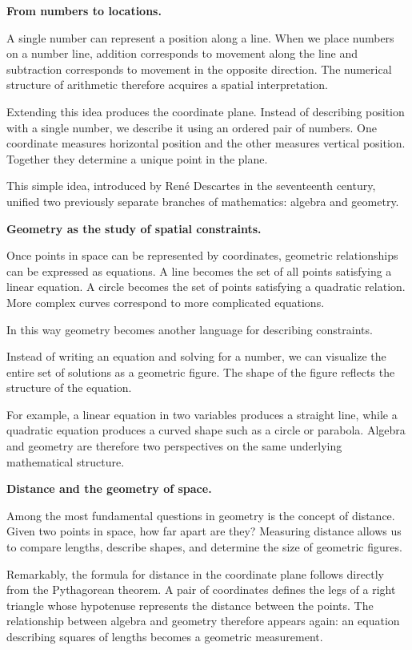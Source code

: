 \documentclass[11pt, openany]{book}
\theoremstyle{plain}
\theoremstyle{definition}
\theoremstyle{remark}
\begin{document}
\medskip

\textbf{From numbers to locations.}

A single number can represent a position along a line. When we place
numbers on a number line, addition corresponds to movement along the
line and subtraction corresponds to movement in the opposite direction.
The numerical structure of arithmetic therefore acquires a spatial
interpretation.

Extending this idea produces the coordinate plane. Instead of describing
position with a single number, we describe it using an ordered pair of
numbers. One coordinate measures horizontal position and the other
measures vertical position. Together they determine a unique point in
the plane.

This simple idea, introduced by René Descartes in the seventeenth
century, unified two previously separate branches of mathematics:
algebra and geometry.

\medskip

\textbf{Geometry as the study of spatial constraints.}

Once points in space can be represented by coordinates, geometric
relationships can be expressed as equations. A line becomes the set of
all points satisfying a linear equation. A circle becomes the set of
points satisfying a quadratic relation. More complex curves correspond
to more complicated equations.

In this way geometry becomes another language for describing
constraints.

Instead of writing an equation and solving for a number, we can visualize
the entire set of solutions as a geometric figure. The shape of the
figure reflects the structure of the equation.

For example, a linear equation in two variables produces a straight
line, while a quadratic equation produces a curved shape such as a
circle or parabola. Algebra and geometry are therefore two perspectives
on the same underlying mathematical structure.

\medskip

\textbf{Distance and the geometry of space.}

Among the most fundamental questions in geometry is the concept of
distance. Given two points in space, how far apart are they? Measuring
distance allows us to compare lengths, describe shapes, and determine
the size of geometric figures.

Remarkably, the formula for distance in the coordinate plane follows
directly from the Pythagorean theorem. A pair of coordinates defines the
legs of a right triangle whose hypotenuse represents the distance
between the points. The relationship between algebra and geometry
therefore appears again: an equation describing squares of lengths
becomes a geometric measurement.
\end{document}

